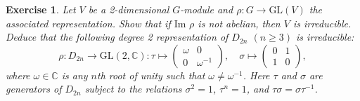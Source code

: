\documentclass{article}
\newtheorem{exercise}[theorem]{Exercise}
\begin{document}
\begin{exercise} Let $V$ be a 2-dimensional $G$-module and $\rho : G \to \text{GL}(V)$ the associated representation. Show that if $\text{Im } \rho$ is not abelian, then $V$ is irreducible. Deduce that the following degree 2 representation of $D_{2n}$ $(n \geq 3)$ is irreducible:
\[
\rho : D_{2n} \to \text{GL}(2, \mathbb{C}) : 
\tau \mapsto 
\begin{pmatrix}
\omega & 0 \\
0 & \omega^{-1}
\end{pmatrix}, \quad 
\sigma \mapsto 
\begin{pmatrix}
0 & 1 \\
1 & 0
\end{pmatrix},
\]
where $\omega \in \mathbb{C}$ is any $n$th root of unity such that $\omega \neq \omega^{-1}$. Here $\tau$ and $\sigma$ are generators of $D_{2n}$ subject to the relations $\sigma^2 = 1$, $\tau^n = 1$, and $\tau\sigma = \sigma\tau^{-1}$.
\end{exercise}
\end{document}
